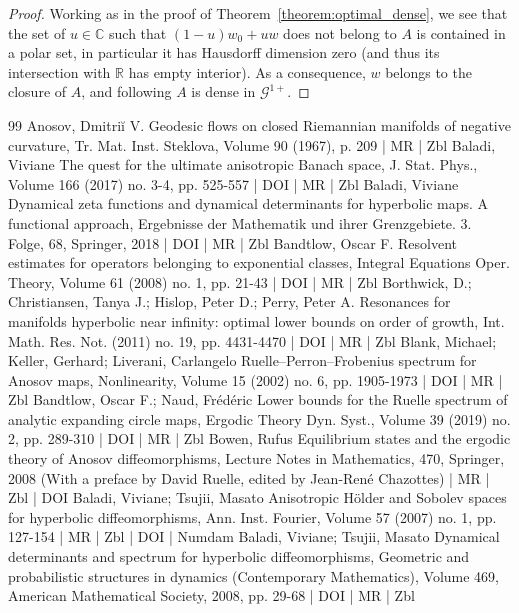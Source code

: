 \documentclass[10pt]{amsart}
\theoremstyle{definition}\newtheorem{defi}[theo]{Definition}\newtheorem{rema}[theo]{Remark}\newtheorem{exam}[theo]{Example}\newtheorem{exem}[theo]{Example}\newtheorem{nota}[theo]{Notation}
\newcommand{\clG}{\mathcal{G}}
\newcommand{\bbC}{\mathbb{C}}
\newcommand{\bbR}{\mathbb{R}}
\begin{document}
\begin{proof}
Working as in the proof of Theorem~\ref{theorem:optimal_dense}, we see that the set of $u \in \bbC$ such that $(1-u) w_0 + u w$ does not belong to $A$ is contained in a polar set, in particular it has Hausdorff dimension zero (and thus its intersection with $\bbR$ has empty interior). As a consequence, $w$ belongs to the closure of $A$, and following $A$ is dense in $\clG^{1+}$.
\end{proof}
\vspace*{30pt}

\break



\begin{thebibliography}{99}
 Anosov, Dmitriĭ V. Geodesic flows on closed Riemannian manifolds of negative curvature, Tr. Mat. Inst. Steklova, Volume 90 (1967), p. 209 | MR | Zbl
 Baladi, Viviane The quest for the ultimate anisotropic Banach space, J. Stat. Phys., Volume 166 (2017) no. 3-4, pp. 525-557 | DOI | MR | Zbl
 Baladi, Viviane Dynamical zeta functions and dynamical determinants for hyperbolic maps. A functional approach, Ergebnisse der Mathematik und ihrer Grenzgebiete. 3. Folge, 68, Springer, 2018 | DOI | MR | Zbl
 Bandtlow, Oscar F. Resolvent estimates for operators belonging to exponential classes, Integral Equations Oper. Theory, Volume 61 (2008) no. 1, pp. 21-43 | DOI | MR | Zbl
 Borthwick, D.; Christiansen, Tanya J.; Hislop, Peter D.; Perry, Peter A. Resonances for manifolds hyperbolic near infinity: optimal lower bounds on order of growth, Int. Math. Res. Not. (2011) no. 19, pp. 4431-4470 | DOI | MR | Zbl
 Blank, Michael; Keller, Gerhard; Liverani, Carlangelo Ruelle–Perron–Frobenius spectrum for Anosov maps, Nonlinearity, Volume 15 (2002) no. 6, pp. 1905-1973 | DOI | MR | Zbl
 Bandtlow, Oscar F.; Naud, Frédéric Lower bounds for the Ruelle spectrum of analytic expanding circle maps, Ergodic Theory Dyn. Syst., Volume 39 (2019) no. 2, pp. 289-310 | DOI | MR | Zbl
 Bowen, Rufus Equilibrium states and the ergodic theory of Anosov diffeomorphisms, Lecture Notes in Mathematics, 470, Springer, 2008 (With a preface by David Ruelle, edited by Jean-René Chazottes) | MR | Zbl | DOI
 Baladi, Viviane; Tsujii, Masato Anisotropic Hölder and Sobolev spaces for hyperbolic diffeomorphisms, Ann. Inst. Fourier, Volume 57 (2007) no. 1, pp. 127-154 | MR | Zbl | DOI | Numdam
 Baladi, Viviane; Tsujii, Masato Dynamical determinants and spectrum for hyperbolic diffeomorphisms, Geometric and probabilistic structures in dynamics (Contemporary Mathematics), Volume 469, American Mathematical Society, 2008, pp. 29-68 | DOI | MR | Zbl

\end{thebibliography}
\end{document}
